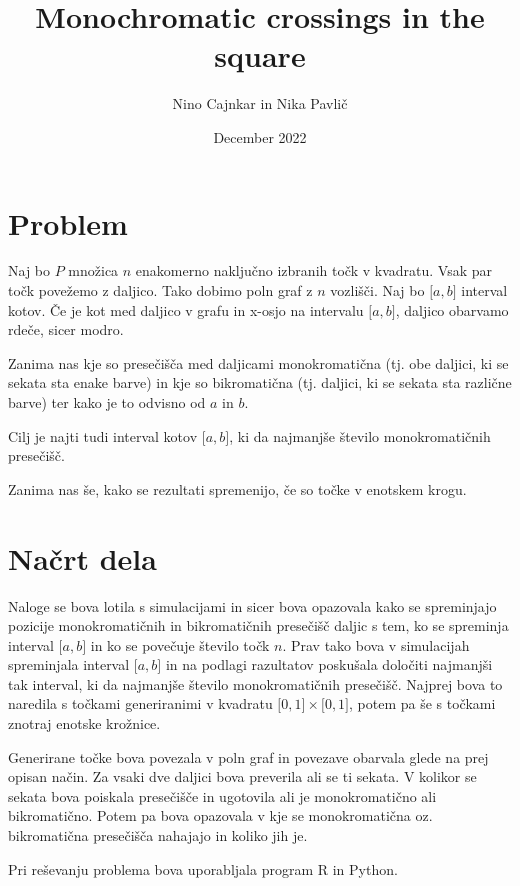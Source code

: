 \documentclass[a4paper,12pt]{article}
\begin{document}
\author{Nino Cajnkar in Nika Pavlič}
\date{December 2022}
\title{Monochromatic crossings in the square}
\maketitle

\section{Problem}
Naj bo $P$ množica $n$ enakomerno naključno izbranih točk v kvadratu. Vsak par točk povežemo z daljico.
Tako dobimo poln graf z $n$ vozlišči.
Naj bo $\lbrack a,b\rbrack$ interval kotov. Če je kot med daljico v grafu in x-osjo na intervalu
$\lbrack a,b\rbrack$, daljico obarvamo rdeče, sicer modro.

Zanima nas kje so presečišča med daljicami monokromatična (tj. obe daljici, ki se sekata sta enake barve)
in kje so bikromatična (tj. daljici, ki se sekata sta različne barve) ter kako je to odvisno od $a$ in $b$.

Cilj je najti tudi interval kotov $\lbrack a,b\rbrack$, ki da najmanjše število monokromatičnih presečišč.

Zanima nas še, kako se rezultati spremenijo, če so točke v enotskem krogu.

\section{Načrt dela}

Naloge se bova lotila s simulacijami in sicer bova opazovala kako se spreminjajo pozicije monokromatičnih in bikromatičnih
presečišč daljic s tem, ko se spreminja interval $\lbrack a,b\rbrack$ in ko se povečuje število točk $n$. Prav tako bova v simulacijah spreminjala interval $\lbrack a,b\rbrack$ 
in na podlagi razultatov poskušala določiti najmanjši tak interval, ki da najmanjše število monokromatičnih presečišč.
Najprej bova to naredila s točkami generiranimi v kvadratu $\lbrack 0,1\rbrack \times \lbrack 0,1\rbrack$, potem pa še s točkami znotraj enotske krožnice.

Generirane točke bova povezala v poln graf in povezave obarvala glede na prej opisan način. Za vsaki dve daljici bova preverila ali se
ti sekata. V kolikor se sekata bova poiskala presečišče in ugotovila ali je monokromatično ali bikromatično.
Potem pa bova opazovala v kje se monokromatična oz. bikromatična presečišča nahajajo in koliko jih je.

Pri reševanju problema bova uporabljala program R in Python.
\end{document}
